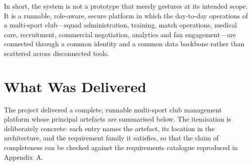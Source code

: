 In short, the system is not a prototype that merely gestures at its intended scope. It is a
runnable, role-aware, secure platform in which the day-to-day operations of a multi-sport
club---squad administration, training, match operations, medical care, recruitment,
commercial negotiation, analytics and fan engagement---are connected through a common
identity and a common data backbone rather than scattered across disconnected tools.

\section{What Was Delivered}
\label{sec:delivered}

The project delivered a complete, runnable multi-sport club management platform whose
principal artefacts are summarised below. The itemisation is deliberately concrete: each
entry names the artefact, its location in the architecture, and the requirement family it
satisfies, so that the claim of completeness can be checked against the requirements
catalogue reproduced in Appendix~A.


